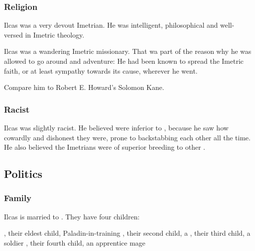 \subsubsection{Religion}
Ilcas was a very devout Imetrian. 
He was intelligent, philosophical and well-versed in Imetric theology. 

Ilcas was a wandering Imetric missionary.
That wa part of the reason why he was allowed to go around and adventure: 
He had been known to spread the Imetric faith, or at least sympathy towards its cause, wherever he went. 

Compare him to Robert E. Howard's Solomon Kane.





\subsubsection{Racist}
Ilcas was slightly racist. 
He believed \humans{} were inferior to \scathae, because he saw how cowardly and dishonest they were, prone to backstabbing each other all the time. 
He also believed the Imetrians were of superior breeding to other \scathae. 









\subsection{Politics}
\subsubsection{Family}
Ilcas is married to . 
They have four children: 

\begin{dramatispersonae}
  , 
    their eldest child, Paladin-in-training 
  , 
    their second child, a \nycaneer{}
  , 
    their third child, a soldier
  , 
    their fourth child, an apprentice mage
\end{dramatispersonae}









